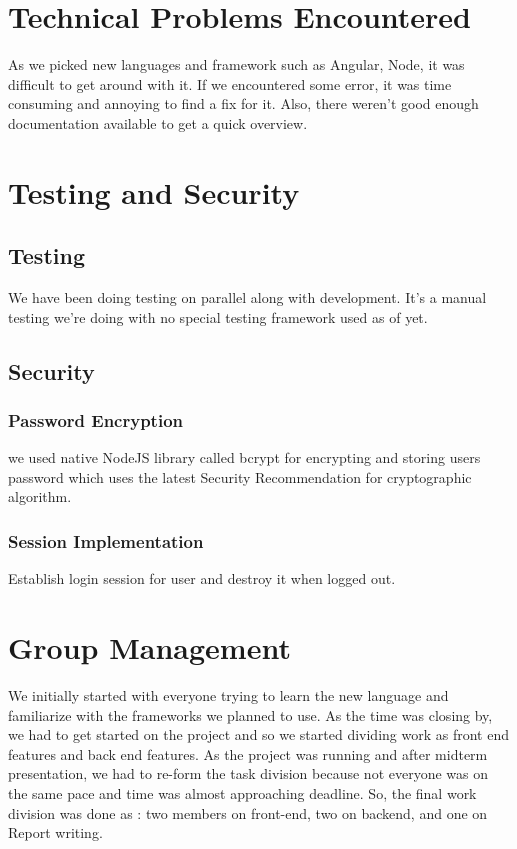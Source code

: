 \documentclass[a4paper]{article}
\begin{document}
\section{Technical Problems Encountered } As we picked new languages and framework such as Angular, Node, it was difficult to get around with it. If we encountered some error, it was time consuming and annoying to find a fix for it. Also, there weren't good enough documentation available to get a quick overview. 

\section{Testing and Security}
\subsection{Testing} We have been doing testing on parallel along with development. It's a manual testing we're doing with no special testing framework used as of yet.

\subsection{Security}
\subsubsection{Password Encryption} we used native NodeJS library called bcrypt for encrypting and storing users password which uses the latest Security Recommendation for cryptographic algorithm. \cite{bcrypt} 

\subsubsection{Session Implementation} Establish login session for user and destroy it when logged out. 

\section{Group Management}
We initially started with everyone trying to learn the new language and familiarize with the frameworks we planned to use. As the time was closing by, we had to get started on the project and so we started dividing work as front end features and back end features.
As the project was running and after midterm presentation, we had to re-form the task division because not everyone was on the same pace and time was almost approaching deadline. So, the final work division was done as : two members on front-end, two on backend, and one on Report writing. 
\end{document}
